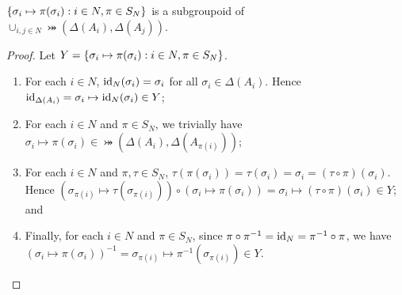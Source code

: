 \begin{proposition} \label{prop:firstgroupoidprop}
	$\left\{\sigma_i \mapsto \pi(\sigma_i): i \in N, \pi \in S_N\right\}$ is a subgroupoid of $\cup_{i, j \in N}\bij(\Delta(A_i), \Delta(A_j))$.
	
	\begin{proof}		
		Let $Y = \left\{\sigma_i \mapsto \pi(\sigma_i): i \in N, \pi \in S_N\right\}$.
		
		\begin{enumerate}
			\item For each $i \in N$, $\text{id}_N(\sigma_i) = \sigma_i$ for all $\sigma_i \in \Delta(A_i)$. Hence $\text{id}_{\Delta(A_i)} = \sigma_i \mapsto \text{id}_N(\sigma_i) \in Y$;
			\item For each $i \in N$ and $\pi \in S_N$, we trivially have $\sigma_i \mapsto \pi(\sigma_i) \in \bij(\Delta(A_i), \Delta(A_{\pi(i)}))$;
			\item For each $i \in N$ and $\pi, \tau \in S_N$, $\tau(\pi(\sigma_i)) = \tau(\sigma_i) = \sigma_i = (\tau \circ \pi)(\sigma_i)$. Hence $(\sigma_{\pi(i)} \mapsto \tau(\sigma_{\pi(i)})) \circ (\sigma_i \mapsto \pi(\sigma_i)) = \sigma_i \mapsto (\tau \circ \pi)(\sigma_i) \in Y$; and
			\item Finally, for each $i \in N$ and $\pi \in S_N$, since $\pi \circ \pi^{-1} = \text{id}_N = \pi^{-1} \circ \pi$, we have $(\sigma_i \mapsto \pi(\sigma_i))^{-1} = \sigma_{\pi(i)} \mapsto \pi^{-1}(\sigma_{\pi(i)}) \in Y$.
		\end{enumerate} \vspace{-0.8cm}
	\end{proof}
\end{proposition}

